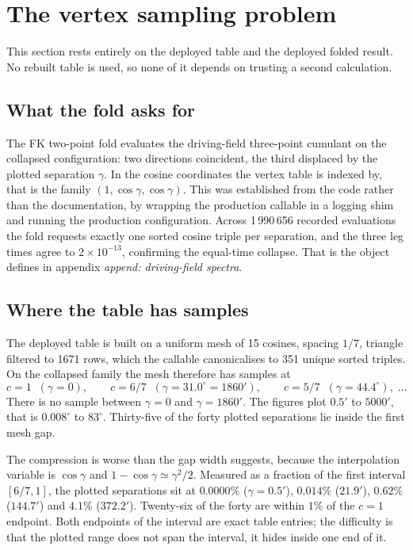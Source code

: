 \section{The vertex sampling problem}
\label{sec:sampling}

This section rests entirely on the deployed table and the deployed folded
result. No rebuilt table is used, so none of it depends on trusting a
second calculation.

\subsection{What the fold asks for}

The FK two-point fold evaluates the driving-field three-point cumulant on
the collapsed configuration: two directions coincident, the third displaced
by the plotted separation $\gamma$. In the cosine coordinates the vertex
table is indexed by, that is the family $(1,\cos\gamma,\cos\gamma)$. This
was established from the code rather than the documentation, by wrapping
the production callable in a logging shim and running the production
configuration. Across 1\,990\,656 recorded evaluations the fold requests
exactly one sorted cosine triple per separation, and the three leg times
agree to $2\times10^{-13}$, confirming the equal-time collapse. That is the
object  defines in appendix
\emph{append: driving-field spectra}.

\subsection{Where the table has samples}

The deployed table is built on a uniform mesh of 15 cosines, spacing
$1/7$, triangle filtered to 1671 rows, which the callable canonicalises to
351 unique sorted triples. On the collapsed family the mesh therefore has
samples at
\[
  c=1 \;\;(\gamma = 0), \qquad
  c=6/7 \;\;(\gamma = 31.0^\circ = 1860'), \qquad
  c=5/7 \;\;(\gamma = 44.4^\circ), \;\ldots
\]
There is no sample between $\gamma=0$ and $\gamma=1860'$. The figures plot
$0.5'$ to $5000'$, that is $0.008^\circ$ to $83^\circ$. Thirty-five of the
forty plotted separations lie inside the first mesh gap.

The compression is worse than the gap width suggests, because the
interpolation variable is $\cos\gamma$ and $1-\cos\gamma \simeq
\gamma^2/2$. Measured as a fraction of the first interval $[6/7,1]$, the
plotted separations sit at $0.0000\%$ ($\gamma=0.5'$), $0.014\%$
($21.9'$), $0.62\%$ ($144.7'$) and $4.1\%$ ($372.2'$). Twenty-six of the
forty are within $1\%$ of the $c=1$ endpoint. Both endpoints of the
interval are exact table entries; the difficulty is that the plotted range
does not span the interval, it hides inside one end of it.

